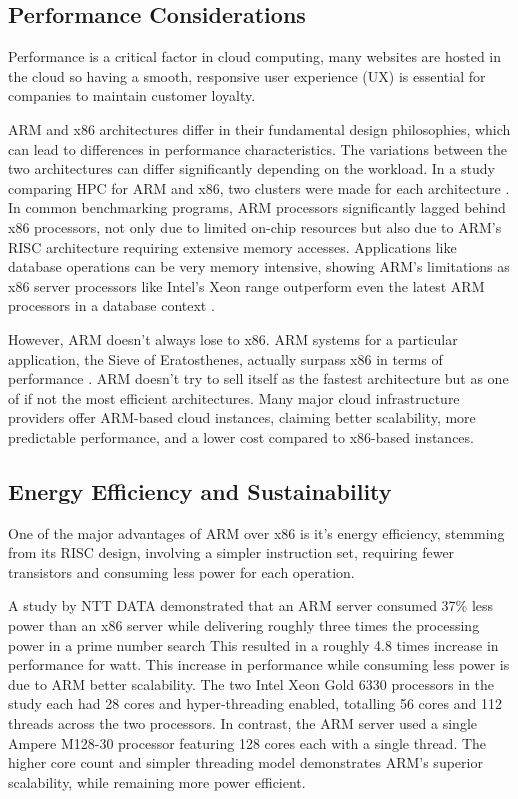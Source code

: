 \documentclass[conference]{IEEEtran}  %
\begin{document}
\subsection{Performance Considerations}
Performance is a critical factor in cloud computing, many websites are hosted in the cloud so having a smooth, responsive user experience (UX) is essential for companies to maintain customer loyalty. 

ARM and x86 architectures differ in their fundamental design philosophies, which can lead to differences in performance characteristics.
The variations between the two architectures can differ significantly depending on the workload.
In a study comparing HPC for ARM and x86, two clusters were made for each architecture \cite{arm_x86_clusters}.
In common benchmarking programs, ARM processors significantly lagged behind x86 processors, not only due to limited on-chip resources but also due to ARM's RISC architecture requiring extensive memory accesses. 
Applications like database operations can be very memory intensive, showing ARM's limitations as x86 server processors like Intel's Xeon range outperform even the latest ARM processors in a database context \cite{arm_database}. 

However, ARM doesn't always lose to x86.
ARM systems for a particular application, the Sieve of Eratosthenes, actually surpass x86 in terms of performance \cite{armBetter}. 
ARM doesn't try to sell itself as the fastest architecture but as one of if not the most efficient architectures. 
Many major cloud infrastructure providers offer ARM-based cloud instances, claiming better scalability, more predictable performance, and a lower cost compared to x86-based instances. \cite{ArmCloudComputing}




\subsection{Energy Efficiency and Sustainability}
One of the major advantages of ARM over x86 is it's energy efficiency, stemming from its RISC design, involving a simpler instruction set, requiring fewer transistors and consuming less power for each operation.

A study by NTT DATA demonstrated that an ARM server consumed 37\% less power than an x86 server while delivering roughly three times the processing power in a prime number search \cite{PrimeArmEfficiency}
This resulted in a roughly 4.8 times increase in performance for watt. 
This increase in performance while consuming less power is due to ARM better scalability. 
The two Intel Xeon Gold 6330 processors in the study each had 28 cores and hyper-threading enabled, totalling 56 cores and 112 threads across the two processors. 
In contrast, the ARM server used a single Ampere M128-30 processor featuring 128 cores each with a single thread. 
The higher core count and simpler threading model demonstrates ARM's superior scalability, while remaining more power efficient.
\end{document}
